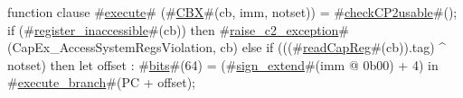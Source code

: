 function clause #\hyperref[zexecute]{execute}# (#\hyperref[zCBX]{CBX}#(cb, imm, notset)) =
{
  #\hyperref[zcheckCPtwousable]{checkCP2usable}#();
  if (#\hyperref[zregisterzyinaccessible]{register\_inaccessible}#(cb)) then
    #\hyperref[zraisezyctwozyexception]{raise\_c2\_exception}#(CapEx_AccessSystemRegsViolation, cb)
  else if (((#\hyperref[zreadCapReg]{readCapReg}#(cb)).tag) ^ notset) then
    {
      let offset : #\hyperref[zbits]{bits}#(64) = (#\hyperref[zsignzyextend]{sign\_extend}#(imm @ 0b00) + 4) in
      #\hyperref[zexecutezybranch]{execute\_branch}#(PC + offset);
    }
}
